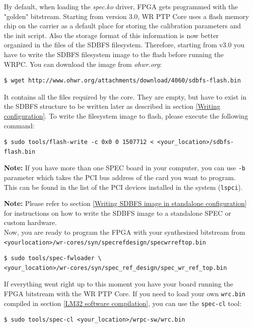 \documentclass[a4paper, 12pt]{article}
\renewcommand{\_}{\underscore\allowbreak}
\newcommand{\code}[1]{\texttt{#1}}
\begin{document}
By default, when loading the \textit{spec.ko} driver, FPGA gets programmed with
the "golden" bitstream. Starting from version 3.0, WR PTP Core uses a flash
memory chip on the carrier as a default place for storing the calibration
parameters and the init script. Also the storage format of this information is
now better organized in the files of the SDBFS filesystem. Therefore, starting
from v3.0 you have to write the SDBFS filesystem image to the flash
before running the WRPC. You can download the image from \textit{ohwr.org}:
\begin{lstlisting}
$ wget http://www.ohwr.org/attachments/download/4060/sdbfs-flash.bin
\end{lstlisting}

It contains all the files required by the core. They are empty, but have to
exist in the SDBFS structure to be written later as described in section
\ref{Writing configuration}. To write the filesystem image to flash, please
execute the following command:
\begin{lstlisting}
$ sudo tools/flash-write -c 0x0 0 1507712 < <your_location>/sdbfs-flash.bin
\end{lstlisting}

\noindent\textbf{Note:} If you have more than one SPEC board in your computer,
you can use \code{-b} parameter which takes the PCI bus address of the card you
want to program. This can be found in the list of the PCI devices installed in
the system (\code{lspci}).

\noindent\textbf{Note:} Please refer to section \ref{Writing SDBFS image in
standalone configuration} for instructions on how to write the SDBFS image to a
standalone SPEC or custom hardware.\\

Now, you are ready to program the FPGA with your synthesized bitstream from
\texttt{<your\_location>/wr-cores/syn/spec\_ref\_design/spec\_wr\_ref\_top.bin}
\begin{lstlisting}
$ sudo tools/spec-fwloader \
<your_location>/wr-cores/syn/spec_ref_design/spec_wr_ref_top.bin
\end{lstlisting}

If everything went right up to this moment you have your board running the FPGA 
bitstream with the WR PTP Core. If you need to load your own \texttt{wrc.bin}
compiled in section \ref{LM32 software compilation}, you can use the
\texttt{spec-cl} tool:
\begin{lstlisting}
$ sudo tools/spec-cl <your_location>/wrpc-sw/wrc.bin
\end{lstlisting}
\end{document}
